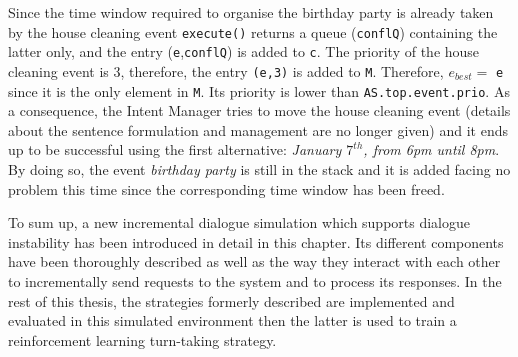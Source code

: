 				Since the time window required to organise the birthday party is already taken by the house cleaning event \texttt{execute()} returns a queue (\texttt{conflQ}) containing the latter only, and the entry (\texttt{e},\texttt{conflQ}) is added to \texttt{c}. The priority of the house cleaning event is 3, therefore, the entry \texttt{(e,3)} is added to \texttt{M}. Therefore, $e_{best} =$ \texttt{e} since it is the only element in \texttt{M}. Its priority is lower than \texttt{AS.top.event.prio}. As a consequence, the Intent Manager tries to move the house cleaning event (details about the sentence formulation and management are no longer given) and it ends up to be successful using the first alternative: \textit{January $7^{th}$, from 6pm until 8pm}. By doing so, the event \textit{birthday party} is still in the stack and it is added facing no problem this time since the corresponding time window has been freed.

                                To sum up, a new incremental dialogue simulation which supports dialogue instability has been introduced in detail in this chapter. Its different components have been thoroughly described as well as the way they interact with each other to incrementally send requests to the system and to process its responses. In the rest of this thesis, the strategies formerly described are implemented and evaluated in this simulated environment then the latter is used to train a reinforcement learning turn-taking strategy. 
